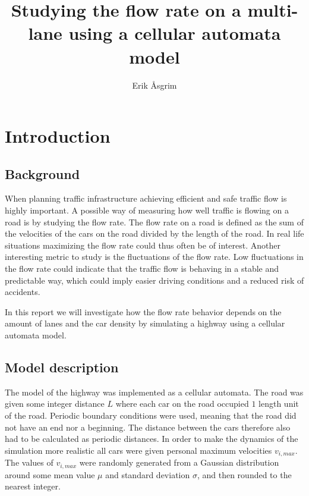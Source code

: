 \documentclass[a4paper,12pt]{article}
\title{Studying the flow rate on a multi-lane using a cellular automata model}
\author{Erik Åsgrim}
\begin{document}
\maketitle

\section*{Introduction}
\subsection*{Background}
When planning traffic infrastructure achieving efficient and safe traffic flow is highly important.
A possible way of measuring how well traffic is flowing on a road is by studying the flow rate.
The flow rate on a road is defined as the sum of the velocities of the cars on the road divided by the length of the road.
In real life situations maximizing the flow rate could thus often be of interest. Another interesting metric to study is the fluctuations of the 
flow rate. Low fluctuations in the flow rate could indicate that the traffic flow is behaving in a stable and predictable way, 
which could imply easier driving conditions and a reduced risk of accidents.

In this report we will investigate how the flow rate behavior depends on the amount of lanes and the car density by simulating
a highway using a cellular automata model.

\subsection*{Model description}
The model of the highway was implemented as a cellular automata. The road was given some integer distance $L$ where each car on the road occupied $1$ length unit of the road. 
Periodic boundary conditions were used, meaning that the road did not have an end nor a beginning. The distance between the cars therefore also had to be calculated as periodic distances.
In order to make the dynamics of the simulation more realistic all cars were given personal maximum velocities $v_{i,max}$. The values of $v_{i, max}$ were randomly generated 
from a Gaussian distribution around some mean value $\mu$ and standard deviation $\sigma$, and then rounded to the nearest integer.
\end{document}
